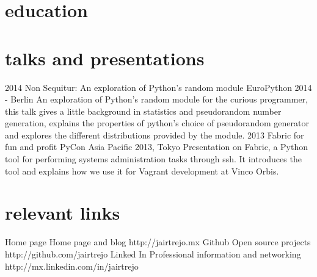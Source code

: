 \documentclass[]{friggeri-cv} %
\def\home{{\FA \faHome}}
\def\github{{\FA \faGithub}}
\def\linkedin{{\FA \faLinkedinSign}}
\begin{document}
\section{education}

\begin{entrylist}

\end{entrylist}


\section{talks and presentations}

\begin{entrylist}
\entry
{2014}
{Non Sequitur: An exploration of Python's random module}
{EuroPython 2014 - Berlin}
{An exploration of Python's random module for the curious programmer, this talk gives a little background in statistics and pseudorandom number generation, explains the properties of python's choice of pseudorandom generator and explores the different distributions provided by the module.}
\entry
{2013}
{Fabric for fun and profit}
{PyCon Asia Pacific 2013, Tokyo}
{Presentation on Fabric, a Python tool for performing systems administration tasks through ssh. It introduces the tool and explains how we use it for Vagrant development at Vinco Orbis.}
\end{entrylist}


\section{relevant links}

\begin{entrylist}
\entry
{Home page}
{\home\enspace Home page and blog}
{}
{http://jairtrejo.mx}
\entry
{Github}
{\github\enspace Open source projects}
{}
{http://github.com/jairtrejo}
\entry
{Linked In}
{\linkedin\enspace Professional information and networking}
{}
{http://mx.linkedin.com/in/jairtrejo}
\end{entrylist}
\end{document}
